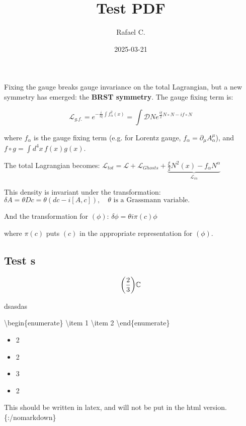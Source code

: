 \documentclass{article}
\title{Test PDF}
\author{Rafael C.}
\date{2025-03-21}
\newcommand{\CC}{\mathbb{C}}
\begin{document}
\maketitle

\tableofcontents

Fixing the gauge breaks gauge invariance on the total Lagrangian, but a new symmetry has emerged: the \textbf{BRST symmetry}. The gauge fixing term is:

\begin{displaymath}
\mathcal{L}_{g.f.} = e^{-\frac{i}{2\xi}\int f_\alpha^2(x)} = \int \mathcal{D}N e^{\frac{i \xi}{2} N \circ N - i f \circ N }
\end{displaymath}

where $f_\alpha$ is the gauge fixing term (e.g. for Lorentz gauge, $f_\alpha = \partial_\mu A^\mu_\alpha$), and $f \circ g = \int d^4x \, f(x) g(x)$.

The total Lagrangian becomes:
$\mathcal{L}_{tot} = \mathcal{L} + \mathcal{L}_{Ghosts} + \underbrace{\frac{\xi}{2} N^2(x) - f_\alpha N^\alpha}_{\mathcal{L}_{in}}$

This density is invariant under the transformation:
$\delta A = \theta D c = \theta (dc - i[A, c]), \quad \theta \text{ is a Grassmann variable.}$

And the transformation for $(\phi)$: $\delta \phi = \theta i \pi (c) \phi$

where $\pi(c)$ puts $( c )$ in the appropriate representation for $( \phi )$.

\subsection{Test s}\hypertarget{test-s}{}\label{test-s}

\begin{displaymath}
\qty(\frac{2}{3}) \CC
\end{displaymath}

dsasdas

\textbackslash{}begin\{enumerate\}
\textbackslash{}item 1
\textbackslash{}item 2
\textbackslash{}end\{enumerate\}

\begin{itemize}
\item{} 2
\item{} 2
\item{} 3
\item{} 2
\end{itemize}

This should be written in latex, and will not be put in the html version.
\{:/nomarkdown\}
\end{document}
